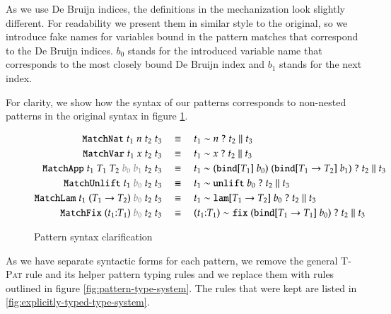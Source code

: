 \documentclass[runningheads]{article}
\newcommand{\tpd}[2]{{#1}{:}{#2}}
\newcommand{\patnat}[1]{#1}
\newcommand{\patapp}[2]{#1\;#2}
\newcommand{\patref}[1]{#1}
\newcommand{\patunlift}[1]{\texttt{unlift}\;#1}
\newcommand{\patbind}[2]{\texttt{bind}[#2]\;#1}
\newcommand{\patlam}[2]{\texttt{lam}[#2]\;#1}
\newcommand{\patfix}[1]{\texttt{fix}\;#1}
\newcommand{\patmat}[4]{\patmatSP{#1}{#2}\patmatThen{#3}#4}
\newcommand{\patmatSP}[2]{#1 \sim #2\;?}
\newcommand{\patmatThen}[1]{\;#1\; \| \;}
\begin{document}
As we use De Bruijn indices, the definitions in the mechanization look slightly different. For readability we present them in similar style to the original, so we introduce fake names for variables bound in the pattern matches that correspond to the De Bruijn indices. $b_0$ stands for the introduced variable name that corresponds to the most closely bound De Bruijn index and $b_1$ stands for the next index.

For clarity, we show how the syntax of our patterns corresponds to non-nested patterns in the original syntax in figure \ref{fig:pattern-syntax}.

\newcommand{\syntaxeq}[2]{ #1 \quad &\equiv \quad #2 \\ }

\begin{figure}[h]
  \centering
  \begin{framed}
    \begin{align}
     \syntaxeq
     { \texttt{MatchNat} \; t_1 \; n \; t_2 \; t_3 }
     { \patmat{t_1}{\patnat{n}}{t_2}{t_3} }     
    \syntaxeq
     { \texttt{MatchVar} \; t_1 \; x \; t_2 \; t_3 }
     { \patmat{t_1}{\patref{x}}{t_2}{t_3} }
         \syntaxeq
     { \texttt{MatchApp} \; t_1 \; T_1 \; T_2 \; {\color{gray}b_0} \; {\color{gray}b_1} \; t_2 \; t_3 }
     { \patmat{t_1}{\patapp{(\patbind{b_0}{T_1})}{(\patbind{b_1}{T_1 \to T_2})}}{t_2}{t_3} }     
         \syntaxeq
     { \texttt{MatchUnlift} \; t_1 \; {\color{gray}b_0} \; t_2 \; t_3 }
     { \patmat{t_1}{\patunlift{b_0}}{t_2}{t_3} }  
         \syntaxeq
     { \texttt{MatchLam} \; t_1 \; (T_1 \to T_2) \; {\color{gray}b_0} \; t_2 \; t_3 }
     { \patmat{t_1}{\patlam{b_0}{T_1 \to T_2}}{t_2}{t_3} }
     \syntaxeq
     { \texttt{MatchFix} \; (\tpd{t_1}{T_1}) \; {\color{gray}b_0} \; t_2 \; t_3 }
     { \patmat{(\tpd{t_1}{T_1})}{\patfix{(\patbind{b_0}{T_1 \to T_1})}}{t_2}{t_3} }
     \end{align}
  \end{framed}
  \caption{Pattern syntax clarification}
  \label{fig:pattern-syntax}
\end{figure}

As we have separate syntactic forms for each pattern, we remove the general \textsc{T-Pat} rule and its helper pattern typing rules and we replace them with rules outlined in figure \ref{fig:pattern-type-system}. The rules that were kept are listed in \ref{fig:explicitly-typed-type-system}.
\end{document}
